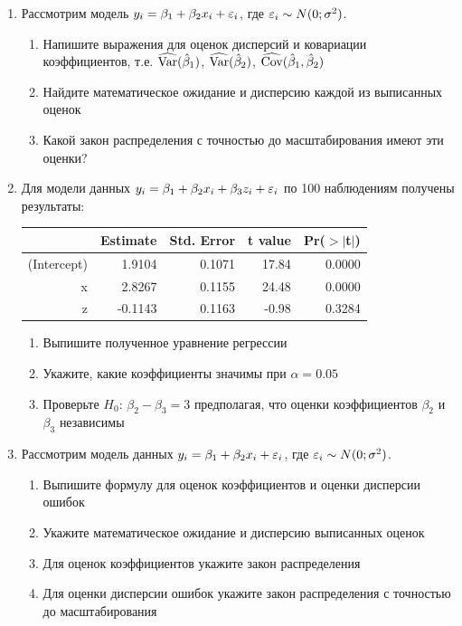 \documentclass[12pt, a4paper]{article}\usepackage[]{graphicx}\usepackage[]{color}
\begin{document}
\begin{enumerate}
\item Рассмотрим модель $y_i=\beta_1 + \beta_2 x_i +\varepsilon_i$, где $\varepsilon_i \sim N(0;\sigma^2)$.

\begin{enumerate}
\item Напишите выражения для оценок дисперсий и ковариации коэффициентов, т.е. $\widehat{\operatorname{Var}}(\hat{\beta}_1)$, $\widehat{\operatorname{Var}}(\hat{\beta}_2)$, $\widehat{\operatorname{Cov}}(\hat{\beta}_1,\hat{\beta}_2)$
\item Найдите математическое ожидание и дисперсию каждой из выписанных оценок
\item Какой закон распределения с точностью до масштабирования имеют эти оценки?
\end{enumerate}

\item Для модели данных $y_i=\beta_1 + \beta_2 x_i + \beta_3 z_i + \varepsilon_i$ по 100 наблюдениям получены результаты:

\begin{table}[ht]
\centering
\begin{tabular}{rrrrr}
  \hline
 & Estimate & Std. Error & t value & Pr($>$$|$t$|$) \\ 
  \hline
(Intercept) & 1.9104 & 0.1071 & 17.84 & 0.0000 \\ 
  x & 2.8267 & 0.1155 & 24.48 & 0.0000 \\ 
  z & -0.1143 & 0.1163 & -0.98 & 0.3284 \\ 
   \hline
\end{tabular}
\end{table}


\begin{enumerate}
\item Выпишите полученное уравнение регрессии
\item Укажите, какие коэффициенты значимы при $\alpha=0.05$
\item Проверьте $H_0$: $\beta_2-\beta_3=3$ предполагая, что оценки коэффициентов $\beta_2$ и  $\beta_3$ независимы
\end{enumerate}

\item Рассмотрим модель данных $y_i=\beta_1 + \beta_2 x_i + \varepsilon_i$, где $\varepsilon_i \sim N(0;\sigma^2)$.
\begin{enumerate}
\item Выпишите формулу для оценок коэффициентов и оценки дисперсии ошибок
\item Укажите математическое ожидание и дисперсию выписанных оценок
\item Для оценок коэффициентов укажите закон распределения
\item Для оценки дисперсии ошибок укажите закон распределения с точностью до масштабирования
\end{enumerate}

\end{enumerate}
\end{document}

